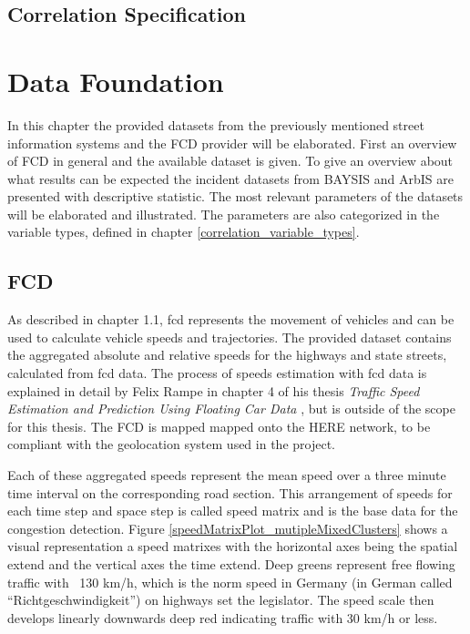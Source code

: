 \documentclass[a4paper,headsepline,footsepline,fontsize=11pt,BCOR=12mm,DIV=12]{report}
\begin{document}
\section{Correlation Specification}


\chapter{Data Foundation}
\label{data}
In this chapter the provided datasets from the previously mentioned street information systems and the FCD provider will be elaborated. First an overview of FCD in general and the available dataset is given. To give an overview about what results can be expected the incident datasets from BAYSIS and ArbIS are presented with descriptive statistic. The most relevant parameters of the datasets will be elaborated and illustrated. The parameters are also categorized in the variable types, defined in chapter \ref{correlation_variable_types}.

\section{FCD}
\label{dataset_fcd}
 
As described in chapter 1.1, \acrshort{fcd} represents the movement of vehicles and can be used to calculate vehicle speeds and trajectories. The provided dataset contains the aggregated absolute and relative speeds for the highways and state streets, calculated from \acrshort{fcd} data. The process of speeds estimation with \acrshort{fcd} data is explained in detail by Felix Rampe in chapter 4 of his thesis \textit{Traffic Speed Estimation and Prediction Using Floating Car Data} \cite{Rempe2018}, but is outside of the scope for this thesis. The FCD is mapped mapped onto the HERE \cite{HERE2020} network, to be compliant with the geolocation system used in the project.


Each of these aggregated speeds represent the mean speed over a three minute time interval on the corresponding road section. This arrangement of speeds for each time step and space step is called speed matrix and is the base data for the congestion detection. Figure \ref{speedMatrixPlot_mutipleMixedClusters} shows a visual representation a speed matrixes with the horizontal axes being the spatial extend and the vertical axes the time extend. Deep greens represent free flowing traffic with ~130 km/h, which is the norm speed in Germany (in German called “Richtgeschwindigkeit”) on highways set the legislator. The speed scale then develops linearly downwards deep red indicating traffic with 30 km/h or less. 
\end{document}

